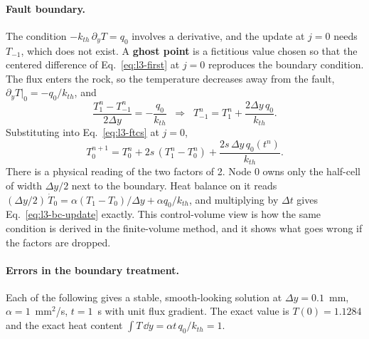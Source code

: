 \paragraph{Fault boundary.} The condition $-k_{th}\,\partial_yT=q_0$ involves a derivative, and the update at $j=0$ needs $T_{-1}$, which does not exist. A \textbf{ghost point} is a fictitious value chosen so that the centered difference of Eq.~\eqref{eq:l3-first} at $j=0$ reproduces the boundary condition. The flux enters the rock, so the temperature decreases away from the fault, $\partial_yT|_0=-q_0/k_{th}$, and
\begin{equation}
\frac{T_1^n-T_{-1}^n}{2\Delta y}=-\frac{q_0}{k_{th}}\;\;\Longrightarrow\;\;T_{-1}^n=T_1^n+\frac{2\Delta y\,q_0}{k_{th}}.
\end{equation}
Substituting into Eq.~\eqref{eq:l3-ftcs} at $j=0$,
\begin{equation}
T_0^{n+1}=T_0^n+2s\,(T_1^n-T_0^n)+\frac{2s\,\Delta y\,q_0(t^n)}{k_{th}}.
\label{eq:l3-bc-update}
\end{equation}
There is a physical reading of the two factors of 2. Node 0 owns only the half-cell of width $\Delta y/2$ next to the boundary. Heat balance on it reads $(\Delta y/2)\,\dot T_0=\alpha(T_1-T_0)/\Delta y+\alpha q_0/k_{th}$, and multiplying by $\Delta t$ gives Eq.~\eqref{eq:l3-bc-update} exactly. This control-volume view is how the same condition is derived in the finite-volume method, and it shows what goes wrong if the factors are dropped.

\paragraph{Errors in the boundary treatment.} Each of the following gives a stable, smooth-looking solution at $\Delta y=0.1$~mm, $\alpha=1$~mm$^2$/s, $t=1$~s with unit flux gradient. The exact value is $T(0)=1.1284$ and the exact heat content $\int T\,\dd y=\alpha t\,q_0/k_{th}=1$.

